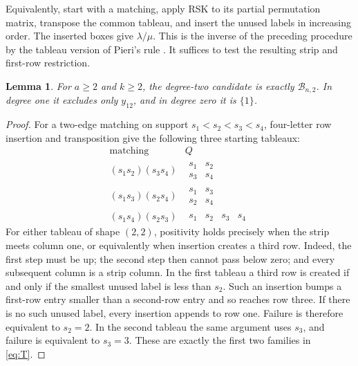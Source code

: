 \documentclass[11pt,a4paper]{article}
\newtheorem{lemma}[theorem]{Lemma}
\newcommand{\BB}{\mathcal{B}_{n,2}}
\begin{document}
Equivalently, start with a matching, apply RSK to its partial permutation
matrix, transpose the common tableau, and insert the unused labels in
increasing order. The inserted boxes give $\lambda/\mu$. This is the
inverse of the preceding procedure by the tableau version of Pieri's
rule \cite[Proposition 3]{ZhuPositive}. It suffices to test the resulting
strip and first-row restriction.

\begin{lemma}\label{lem:tableaux}
For $a\geq2$ and $k\geq2$, the degree-two candidate is exactly $\BB$.
In degree one it excludes only $y_{12}$, and in degree zero it is $\{1\}$.
\end{lemma}

\begin{proof}
For a two-edge matching on support $s_1<s_2<s_3<s_4$, four-letter row
insertion and transposition give the following three starting tableaux:
\begin{equation}\label{eq:tableaux}
\begin{array}{c|c}
 \text{matching}&Q\\ \hline
 (s_1s_2)(s_3s_4)&
    \begin{matrix}s_1&s_2\\s_3&s_4\end{matrix}\\[6pt]
 (s_1s_3)(s_2s_4)&
    \begin{matrix}s_1&s_3\\s_2&s_4\end{matrix}\\[6pt]
 (s_1s_4)(s_2s_3)&
    \begin{matrix}s_1&s_2&s_3&s_4\end{matrix}
\end{array}
\end{equation}
For either tableau of shape $(2,2)$, positivity holds precisely when
the strip meets column one, or equivalently when insertion creates a
third row. Indeed, the first step must be up; the second step then
cannot pass below zero; and every subsequent column is a strip column.
In the first tableau a third row is created if and only if the smallest
unused label is less than $s_2$. Such an insertion bumps a first-row
entry smaller than a second-row entry and so reaches row three.
If there is no such unused label, every insertion appends to row one.
Failure is therefore equivalent to $s_2=2$. In the second tableau
the same argument uses $s_3$, and failure is equivalent to $s_3=3$.
These are exactly the first two families in \eqref{eq:T}.


\end{proof}
\end{document}
